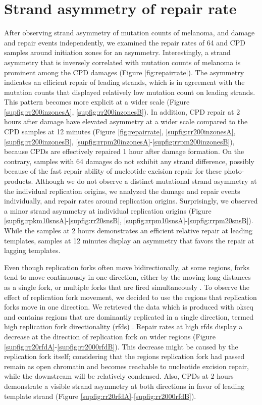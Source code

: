 \section{Strand asymmetry of repair rate}

After observing strand asymmetry of mutation counts of melanoma, and damage and repair events independently, we examined the repair rates of \gls{64} and \gls{CPD} samples around initiation zones for an asymmetry. Interestingly, a strand asymmetry that is inversely correlated with mutation counts of melanoma is prominent among the \gls{CPD} damages (Figure \ref{fig:repairrate}). The asymmetry indicates an efficient repair of leading strands, which is in agreement with the mutation counts that displayed relatively low mutation count on leading strands. This pattern becomes more explicit at a wider scale (Figure \ref{supfig:rr200inzonesA}, \ref{supfig:rr200inzonesB}). In addition, \gls{CPD} repair at 2 hours after damage have elevated asymmetry at a wider scale compared to the \gls{CPD} samples at 12 minutes (Figure \ref{fig:repairrate}, \ref{supfig:rr200inzonesA}, \ref{supfig:rr200inzonesB}, \ref{supfig:rrpm20inzonesA}-\ref{supfig:rrpm200inzonesB}), because \gls{CPD}s are effectively repaired 1 hour after damage formation. On the contrary, samples with \gls{64} damages do not exhibit any strand difference, possibly because of the fast repair ability of nucleotide excision repair for these photo-products. Although we do not observe a distinct mutational strand asymmetry at the individual replication origins, we analyzed the damage and repair events individually, and repair rates around replication origins. Surprisingly, we observed a minor strand asymmetry at individual replication origins (Figure \ref{supfig:rpkm10snsA}-\ref{supfig:rr20snsB}, \ref{supfig:rrpm10snsA}-\ref{supfig:rrpm20snsB}). While the samples at 2 hours demonstrates an efficient relative repair at leading templates, samples at 12 minutes display an asymmetry that favors the repair at lagging templates. 

Even though replication forks often move bidirectionally, at some regions, forks tend to move continuously in one direction, either by the moving long distances as a single fork, or multiple forks that are fired simultaneously \citep{takebayashi2017anatomy}. To observe the effect of replication fork movement, we decided to use the regions that replication forks move in one direction. We retrieved the data which is produced with \gls{okseq} and contains regions that are dominantly replicated in a single direction, termed high replication fork directionality (\gls{rfd}s) \citep{petryk2016replication}. Repair rates at high \gls{rfd}s display a decrease at the direction of replication fork on wider regions (Figure \ref{supfig:rr20rfdA}-\ref{supfig:rr2000rfdB}). This decrease might be caused by the replication fork itself; considering that the regions replication fork had passed remain as open chromatin and becomes reachable to nucleotide excision repair, while the downstream will be relatively condensed. Also, \gls{CPD}s at 2 hours demonstrate a visible strand asymmetry at both directions in favor of leading template strand (Figure \ref{supfig:rr20rfdA}-\ref{supfig:rr2000rfdB}). 


